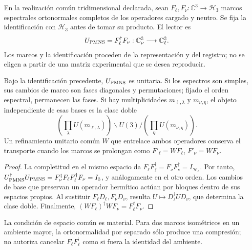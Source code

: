 \begin{definition}
En la realización común tridimensional declarada, sean
\(F_\ell,F_\nu:\mathbb C^3\to\mathcal H_3\) marcos espectrales
ortonormales completos de los operadores cargado y neutro. Se fija la
identificación con \(\mathcal H_3\) antes de tomar su producto. El lector es
\begin{equation}
 U_{\rm PMNS}=F_\ell^\dagger F_\nu:
 \mathbb C^3_\nu\longrightarrow\mathbb C^3_\ell.
 \label{eq:ii-pmns-frames}
\end{equation}
Los marcos y la identificación proceden de la representación y del
registro; no se eligen a partir de una matriz experimental que se desea
reproducir.
\end{definition}

\begin{theorem}
Bajo la identificación precedente, \(U_{\rm PMNS}\) es unitaria.
Si los espectros son simples, sus cambios de marco son fases diagonales
y permutaciones; fijado el orden espectral, permanecen las fases.
Si hay multiplicidades \(m_{\ell,\lambda}\) y \(m_{\nu,\eta}\), el
objeto independiente de esas bases es la clase doble
\begin{equation}
 \left(\prod_\lambda U(m_{\ell,\lambda})\right)
 \backslash U(3) /
 \left(\prod_\eta U(m_{\nu,\eta})\right).
 \label{eq:ii-pmns-double-class}
\end{equation}
Un refinamiento unitario común \(W\) que entrelace ambos operadores
conserva el transporte cuando los marcos se prolongan como
\(F'_\ell=WF_\ell\), \(F'_\nu=WF_\nu\).
\end{theorem}

\begin{proof}
La completitud en el mismo espacio da
\(F_\ell F_\ell^\dagger=F_\nu F_\nu^\dagger=I_{\mathcal H_3}\).
Por tanto,
\(U_{\rm PMNS}^\dagger U_{\rm PMNS}
=F_\nu^\dagger F_\ell F_\ell^\dagger F_\nu=I_3\), y análogamente
en el otro orden. Los cambios de base que preservan un operador hermítico
actúan por bloques dentro de sus espacios propios. Al sustituir
\(F_\ell D_\ell,F_\nu D_\nu\), resulta
\(U\mapsto D_\ell^\dagger UD_\nu\), que determina la clase doble.
Finalmente, \((WF_\ell)^\dagger WF_\nu=F_\ell^\dagger F_\nu\).
\end{proof}

La condición de espacio común es material. Para dos marcos isométricos en
un ambiente mayor, la ortonormalidad por separado sólo produce una
compresión; no autoriza cancelar \(F_\ell F_\ell^\dagger\) como si
fuera la identidad del ambiente.


